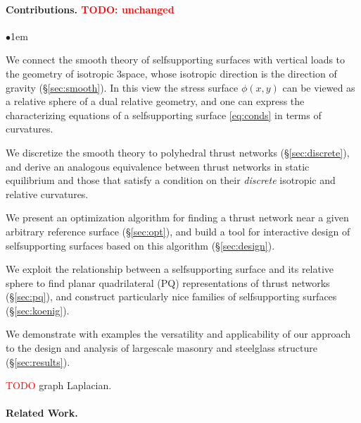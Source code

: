 \documentclass[annual]{acmsiggraph}
\newcommand{\todo}[1]{\textcolor{red}{#1}}
\newcommand{\secref}[1]{(\S\ref{#1})}
\begin{document}
\paragraph{Contributions. \todo{TODO: unchanged}}


\begin{list}{$\bullet$}{\itemindent1em}

\item We connect the smooth theory of self\dash supporting surfaces with 
vertical loads to the geometry of isotropic 3\dash space, whose isotropic 
direction is the direction of gravity \secref{sec:smooth}. In this view 
the stress surface $\phi(x,y)$ can be viewed as a relative sphere of a 
dual relative geometry, and one can express the characterizing equations 
of a self\dash supporting surface \eqref{eq:conds} in terms of curvatures.

\item We discretize the smooth theory to polyhedral thrust networks 
\secref{sec:discrete}, and derive an analogous equivalence between thrust 
networks in static equilibrium and those that satisfy a condition on their 
\emph{discrete} isotropic and relative curvatures.

\item We present an optimization algorithm for finding a thrust network 
near a given arbitrary reference surface \secref{sec:opt}, and build a 
tool for interactive design of self\dash supporting surfaces based on this 
algorithm \secref{sec:design}.

\item We exploit the relationship between a self\dash supporting surface 
and its relative sphere to find planar quadrilateral (PQ) representations 
of thrust networks \secref{sec:pq}, and construct particularly nice 
families of self\dash supporting surfaces \secref{sec:koenig}.

\item We demonstrate with examples the versatility and applicability of 
our approach to the design and analysis of large\dash scale masonry and 
steel\dash glass structure \secref{sec:results}.

\item \todo{TODO} graph Laplacian.

\end{list}

\paragraph{Related Work.}
\end{document}
